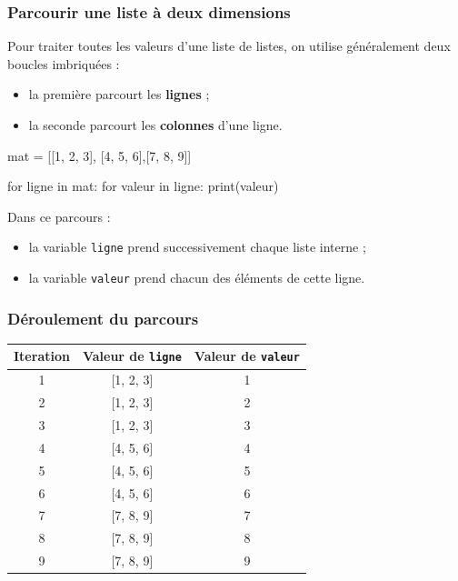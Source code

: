\documentclass[11pt]{article}
\begin{document}
		\subsubsection*{Parcourir une liste à deux dimensions}
		
		Pour traiter toutes les valeurs d’une liste de listes, on utilise généralement deux boucles
		imbriquées :
		
		\begin{itemize}
			\item la première parcourt les \textbf{lignes} ;
			\item la seconde parcourt les \textbf{colonnes} d’une ligne.
		\end{itemize}
		
		\begin{python}
		mat = [[1, 2, 3], [4, 5, 6],[7, 8, 9]]
			
		for ligne in mat:
			for valeur in ligne:
				print(valeur)\end{python}
		
		Dans ce parcours :
		
		\begin{itemize}
			\item la variable \texttt{ligne} prend successivement chaque liste interne ;
			\item la variable \texttt{valeur} prend chacun des éléments de cette ligne.
		\end{itemize}
		
		\subsubsection*{Déroulement du parcours}
		
		\begin{center}
			\begin{tabular}{|c|c|c|}
				\hline
				\textbf{Iteration} & \textbf{Valeur de \texttt{ligne}} & \textbf{Valeur de \texttt{valeur}} \\
				\hline
				1 & [1, 2, 3] & 1 \\
				\hline
				2 & [1, 2, 3] & 2 \\
				\hline
				3 & [1, 2, 3] & 3 \\
				\hline
				4 & [4, 5, 6] & 4 \\
				\hline
				5 & [4, 5, 6] & 5 \\
				\hline
				6 & [4, 5, 6] & 6 \\
				\hline
				7 & [7, 8, 9] & 7 \\
				\hline
				8 & [7, 8, 9] & 8 \\
				\hline
				9 & [7, 8, 9] & 9 \\
				\hline
			\end{tabular}
		\end{center}
		
\end{document}
